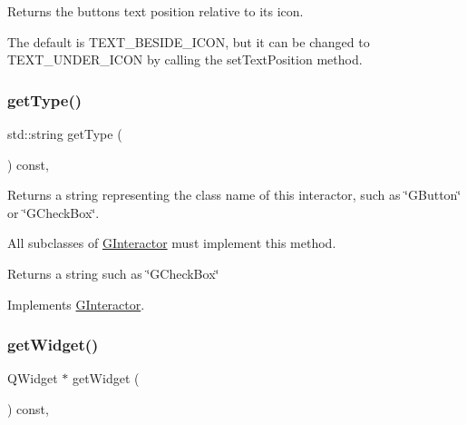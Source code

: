 Returns the button\textquotesingle{}s text position relative to its icon. 

The default is T\+E\+X\+T\+\_\+\+B\+E\+S\+I\+D\+E\+\_\+\+I\+C\+ON, but it can be changed to T\+E\+X\+T\+\_\+\+U\+N\+D\+E\+R\+\_\+\+I\+C\+ON by calling the set\+Text\+Position method. \mbox{\label{classsgl_1_1GButton_a9b72ede4ee8520f987a0c01e30654814}} 
\subsubsection{\texorpdfstring{get\+Type()}{getType()}}
{\footnotesize\ttfamily std\+::string get\+Type (\begin{DoxyParamCaption}{ }\end{DoxyParamCaption}) const\hspace{0.3cm}{\ttfamily [override]}, {\ttfamily [virtual]}}



Returns a string representing the class name of this interactor, such as \char`\"{}\+G\+Button\char`\"{} or \char`\"{}\+G\+Check\+Box\char`\"{}. 

All subclasses of \mbox{\hyperlink{classsgl_1_1GInteractor}{G\+Interactor}} must implement this method. \begin{DoxyReturn}{Returns}
a string such as \char`\"{}\+G\+Check\+Box\char`\"{} 
\end{DoxyReturn}


Implements \mbox{\hyperlink{classsgl_1_1GInteractor_a44c407a54a20dd0f2fff30338289299d}{G\+Interactor}}.

\mbox{\label{classsgl_1_1GButton_a3b33a602b31a6b809d020535a59db3b4}} 
\subsubsection{\texorpdfstring{get\+Widget()}{getWidget()}}
{\footnotesize\ttfamily Q\+Widget $\ast$ get\+Widget (\begin{DoxyParamCaption}{ }\end{DoxyParamCaption}) const\hspace{0.3cm}{\ttfamily [override]}, {\ttfamily [virtual]}}



